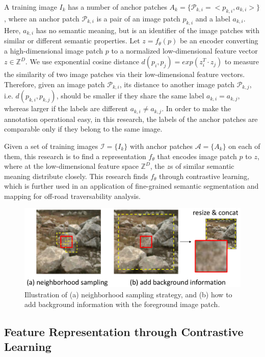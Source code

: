 \documentclass[letterpaper, 10 pt, conference]{ieeeconf}  %
\begin{document}
A training image $I_k$ has a number of anchor patches $A_k=\{\mathcal{P}_{k,i}=<p_{k,i},a_{k,i}>\}$, where an anchor patch $\mathcal{P}_{k,i}$ is a pair of an image patch $p_{k,i}$ and a label $a_{k,i}$. Here, $a_{k,i}$ has no semantic meaning, but is an identifier of the image patches with similar or different semantic properties.
Let $z=f_{\theta}(p)$ be an encoder converting a high-dimensional image patch $p$ to a normalized low-dimensional feature vector $z\in \mathbb{Z}^D$. 
We use exponential cosine distance $d(p_i,p_j)=exp(z_i^T \cdot z_j)$ to measure the similarity of two image patches via their low-dimensional feature vectors.
Therefore, given an image patch $\mathcal{P}_{k,i}$, its distance to another image patch $\mathcal{P}_{k,j}$, i.e. $d(p_{k,i},p_{k,j})$, should be smaller if they share the same label $a_{k,i}=a_{k,j}$, whereas larger if the labels are different $a_{k,i} \neq a_{k,j}$.
In order to make the annotation operational easy, in this research, the labels of the anchor patches are comparable only if they belong to the same image.

Given a set of training images $\mathcal{I}=\{I_k\}$ with anchor patches $\mathcal{A}=\{A_k\}$ on each of them, this research is to find a representation $f_{\theta}$ that encodes image patch $p$ to $z$, where at the low-dimensional feature space $\mathbb{Z}^D$, the $z$s of similar semantic meaning distribute closely. 
This research finds $f_{\theta}$ through contrastive learning, which is further used in an application of fine-grained semantic segmentation and mapping for off-road traversability analysis.

\begin{figure}[]
	\centering
	\includegraphics[scale=0.235]{dataaug.pdf}
	\caption{Illustration of (a) neighborhood sampling strategy, and (b) how to add background information with the foreground image patch.}
	\label{fig:dataaug}
\end{figure}

\subsection{Feature Representation through Contrastive Learning}
\end{document}
